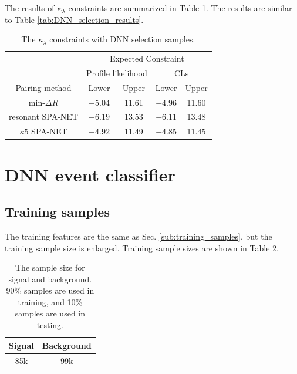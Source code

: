 \documentclass[12pt]{article}
\begin{document}
		The results of $\kappa_\lambda$ constraints are summarized in Table \ref{tab:kappa_constraint3}. The results are similar to Table \ref{tab:DNN_selection_results}.
		\begin{table}[htpb]
			\centering
			\caption{The $\kappa_\lambda$ constraints with DNN selection samples.}
			\label{tab:kappa_constraint3}
			\begin{tabular}{c|cc|cc}
								  & \multicolumn{4}{c}{Expected Constraint}                          \\
								  & \multicolumn{2}{c}{Profile likelihood} & \multicolumn{2}{c}{CLs} \\ \hline
			Pairing method        & Lower              & Upper             & Lower      & Upper      \\ \hline
			$\text{min-}\Delta R$ & $-5.04$            & 11.61             & $-4.96$      & 11.60      \\
			resonant SPA-NET      & $-6.19$            & 13.53             & $-6.11$      & 13.48      \\
			$\kappa 5$ SPA-NET    & $-4.92$            & 11.49             & $-4.85$      & 11.45   
			\end{tabular}
		\end{table}
\section{DNN event classifier}%
\label{sec:dnn_event_classifier}
	\subsection{Training samples}%
	\label{sub:training_samples2}
		The training features are the same as Sec. \ref{sub:training_samples}, but the training sample size is enlarged. Training sample sizes are shown in Table \ref{tab:DNN_sample_size2}.
		\begin{table}[htpb]
			\centering
			\caption{The sample size for signal and background. 90\% samples are used in training, and 10\% samples are used in testing.}
			\label{tab:DNN_sample_size2}
			\begin{tabular}{c|c}
			 Signal & Background\\ \hline
			 85k      & 99k      
			\end{tabular}
		\end{table}

\end{document}
